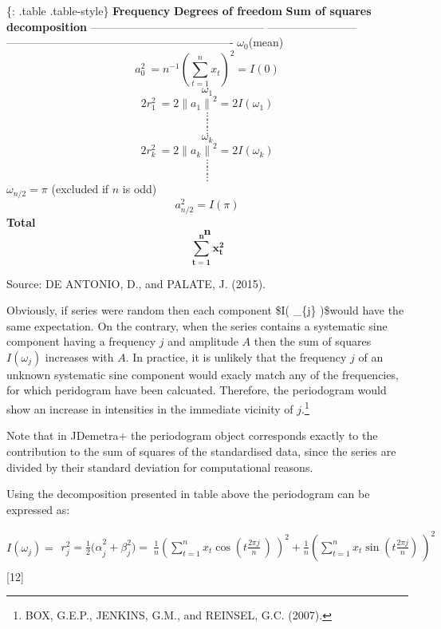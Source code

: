 \documentclass[
  letterpaper,
  DIV=11,
  numbers=noendperiod]{scrreprt}
\begin{document}
\{: .table .table-style\} \textbar{}\textbf{Frequency}
\textbar{}\textbf{Degrees of freedom} \textbar{}\textbf{Sum of squares
decomposition}\textbar{}
\textbar-----------------------------------------------
\textbar------------------------
\textbar-------------------------------------------------------------\textbar{}
\textbar{}\(\omega_{0}\)(mean) 
\textbar{}\[{a_{0}^{2}}_{\ }=n^{- 1}\left( \sum_{t=1}^{n}x_{t} \right)^{2} = I\left( 0 \right)\]\textbar{}
\textbar{}\[\omega_{1}\] 
\textbar{}\[{2r_{1}^{2}}_{\ } = 2{\|a_{1}\|}^{2} = 2I\left( \omega_{1} \right)\]\textbar{}
\textbar{}\[\vdots\] \textbar{}\[\vdots\] \textbar{}\[\vdots\]\textbar{}
\textbar{}\[\omega_{k}\] 
\textbar{}\[{2r_{k}^{2}}_{\ } = 2{\|a_{k}\|}^{2} = 2I\left( \omega_{k} \right)\]\textbar{}
\textbar{}\[\vdots\] \textbar{}\[\vdots\] \textbar{}\[\vdots\]\textbar{}
\textbar{}\(\omega_{n/2} = \pi\) (excluded if \(n\) is odd) 
\textbar{}\[a_{n/2}^{2} = I\left( \pi \right)\]\textbar{}
\textbar{}\textbf{Total} \textbar{}\[\mathbf{n}\]
\textbar{}\[\sum_{\mathbf{t = 1}}^{\mathbf{n}}\mathbf{x}_{\mathbf{t}}^{\mathbf{2}}\]\textbar{}

Source: DE ANTONIO, D., and PALATE, J. (2015).

Obviously, if series were random then each component \$I\left(
\omega\_\{j\} \right)\$would have the same expectation. On the contrary,
when the series contains a systematic sine component having a frequency
\(j\) and amplitude \(A\) then the sum of squares
\(I\left( \omega_{j} \right)\) increases with \(A\). In practice, it is
unlikely that the frequency \(j\) of an unknown systematic sine
component would exacly match any of the frequencies, for which
peridogram have been calcuated. Therefore, the periodogram would show an
increase in intensities in the immediate vicinity of \(j\).\footnote{BOX,
  G.E.P., JENKINS, G.M., and REINSEL, G.C. (2007).}

Note that in JDemetra+ the periodogram object corresponds exactly to the
contribution to the sum of squares of the standardised data, since the
series are divided by their standard deviation for computational
reasons.

Using the decomposition presented in table above the periodogram can be
expressed as:

\[
I\left( \omega_{j} \right)\mathbf{=}\begin{matrix}                                                                                r_{j}^{2} = \frac{1}{2}{(\alpha}_{j}^{2} + \beta_{j}^{2}) = \ {\frac{1}{n}\left( \sum_{t = 1}^{n}{x_{t}\cos{\left( {t\frac{2\pi j}{n}}_{\ } \right)\ }} \right)}^{2} + \frac{1}{n}\left( \sum_{t = 1}^{n}{x_{t}\sin\left( t\frac{2\pi j}{n} \right)_{\ }} \right)^{2} \\   
\end{matrix}
\] {[}12{]}
\end{document}
